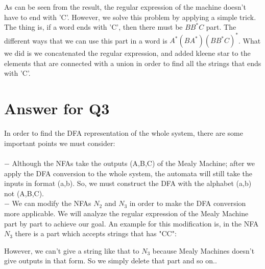 \documentclass[12pt]{article}
\begin{document}
As can be seen from the result, the regular expression of the machine doesn't have to end with 'C'. However, we solve this problem by applying a simple trick. The thing is, if a word ends with 'C', then there must be $BB^* C$ part. The different ways that we can use this part in a word is $A^* (BA^*) (BB^* C)^*$. What we did is we concatenated the regular expression, and added kleene star to the elements that are connected with a union in order to find all the strings that ends with 'C'.


\section*{Answer for Q3}

In order to find the DFA representation of the whole system, there are some important points we must consider:\\
\\
$-$ Although the NFAs take the outputs (A,B,C) of the Mealy Machine; after we apply the DFA conversion to the whole system, the automata will still take the inputs in format (a,b). So, we must construct the DFA with the alphabet (a,b) not (A,B,C).\\
$-$ We can modify the NFAs $N_2$ and $N_3$ in order to make the DFA conversion more applicable. We  will analyze the regular expression of the Mealy Machine part by part to achieve our goal. An example for this modification is, in the NFA $N_3$ there is a part which accepts strings that has "CC":\\

\begin{center}
\end{center}

   
However, we can't give a string like that to $N_3$ because Mealy Machines doesn't give outputs in that form. So we simply delete that part and so on..\\
\end{document}
